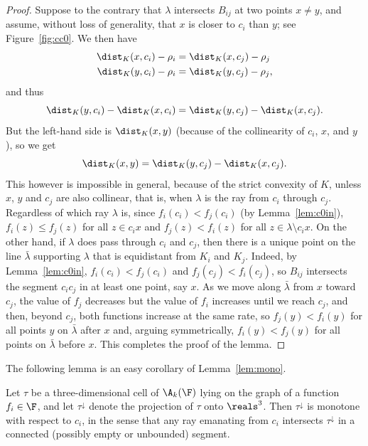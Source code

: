 \begin{proof}
Suppose to the contrary that $\lambda$ intersects $B_{ij}$ at 
two points $x\ne y$, and assume, without loss of generality, that $x$ is closer to 
$c_i$ than $y$; see Figure~\ref{fig:cc0}. We then have
\begin{align*}
\dist_K(x,c_i) - \rho_i & = \dist_K(x,c_j) - \rho_j \\
\dist_K(y,c_i) - \rho_i & = \dist_K(y,c_j) - \rho_j ,
\end{align*}
and thus
\[
\dist_K(y,c_i) - \dist_K(x,c_i) = \dist_K(y,c_j) - \dist_K(x,c_j) .
\]
But the left-hand side is $\dist_K(x,y)$ (because of the collinearity of $c_i$, $x$, and $y$), so we get
\[
\dist_K(x,y) = \dist_K(y,c_j) - \dist_K(x,c_j) .
\]
This however is impossible in general, because of the strict convexity of $K$, unless $x$, $y$ and $c_j$ 
are also collinear, that is, when $\lambda$ is the ray from $c_i$ through $c_j$. 
Regardless of which ray $\lambda$ is, since $f_i(c_i) < f_j(c_i)$ (by Lemma~\ref{lem:c0in}), 
$f_i(z) \le f_j(z)$ for all $z\in c_i x$ and $f_j (z) < f_i(z)$ for all $z\in\lambda\setminus c_ix$.
%
On the other hand, if $\lambda$ does pass through $c_i$ and $c_j$, then there is a unique point 
on the line $\bar\lambda$ supporting $\lambda$ that is equidistant from $K_i$ and $K_j$. 
	Indeed, by Lemma~\ref{lem:c0in}, $f_i(c_i) < f_j(c_i)$ and $f_j(c_j) < f_i(c_j)$,
so $B_{ij}$ intersects the segment $c_ic_j$ in at least one point, say $x$. As we 
move along $\bar\lambda$ from  $x$ toward $c_j$, the value of $f_j$ decreases but the value of 
$f_i$ increases until we reach $c_j$, and then, beyond $c_j$, both functions increase at the 
same rate, so $f_j(y)< f_i(y)$ for all points $y$ on $\bar\lambda$ after $x$ and, arguing symmetrically, 
$f_i(y)<f_j(y)$ for all points on $\bar\lambda$ before $x$. This completes the proof of the lemma.
\end{proof}
%
The following lemma is an easy corollary of Lemma~\ref{lem:mono}.
\begin{lemma}
	\label{lem:star} 
	Let $\tau$ be a three-dimensional cell of $\A_{k}(\F)$
	lying on the graph of a function $f_i\in\F$, and let $\tau^\downarrow$ 
	denote the projection of $\tau$ onto $\reals^3$.  Then $\tau^\downarrow$ is 
	monotone with respect to $c_i$, in the sense that any ray emanating from 
	$c_i$ intersects $\tau^\downarrow$ in a connected (possibly empty or 
	unbounded) segment.
\end{lemma}
